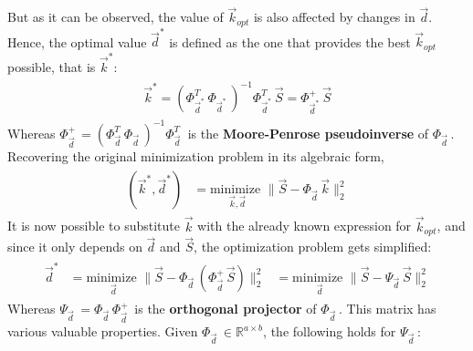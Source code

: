 \documentclass[11pt]{scrartcl} %
\begin{document}
But as it can be observed, the value of \(\vec{k}_{opt}\) is also affected by changes in \(\vec{d}\). Hence, the optimal value \(\vec{d}^*\) is defined as the one that provides the best \(\vec{k}_{opt}\) possible, that is \(\vec{k}^*\):
\begin{align*}
    \begin{aligned}
      \vec{k}^* =  (\Phi_{\vec{d}^*\;}^T \Phi_{\vec{d}^*\;})^{-1} \Phi_{\vec{d}^*\;}^T\vec{S} = \Phi_{\vec{d}^*\;}^+ \vec{S}
    \end{aligned}
\end{align*}
Whereas \(\Phi_{\vec{d}\;}^+ = (\Phi_{\vec{d}\;}^T \Phi_{\vec{d}\;})^{-1} \Phi_{\vec{d}\;}^T\) is the \textbf{Moore-Penrose pseudoinverse} of \(\Phi_{\vec{d}\;}\).\\
Recovering the original minimization problem in its algebraic form,
\begin{align*}
  \begin{aligned}
    (\vec{k}^*, \vec{d}^*) &= \underset{\vec{k}, \vec{d}}{\text{minimize }}
    \bigg\lVert \vec{S}-\Phi_{\vec{d}\;} \vec{k}\bigg\rVert_2^2
    \end{aligned}
\end{align*}
It is now possible to substitute \(\vec{k}\) with the already known expression for \(\vec{k}_{opt}\), and since it only depends on \(\vec{d}\) and \(\vec{S}\), the optimization problem gets simplified:
\begin{align*}
  \begin{aligned}
    \vec{d}^* &= \underset{\vec{d}}{\text{minimize }}
    \bigg\lVert \vec{S}-\Phi_{\vec{d}\;} (\Phi_{\vec{d}\;}^+ \vec{S}) \bigg\rVert_2^2 &= \underset{\vec{d}}{\text{minimize }}
    \bigg\lVert \vec{S}- \Psi_{\vec{d}\;} \vec{S} \bigg\rVert_2^2
    \end{aligned}
\end{align*}
Whereas \(\Psi_{\vec{d}\;} =  \Phi_{\vec{d}\;} \Phi_{\vec{d}\;}^+\) is the \textbf{orthogonal projector} of \(\Phi_{\vec{d}\;}\). This matrix has various valuable properties. Given \(\Phi_{\vec{d}\;}\in\mathbb{R}^{a\times b}\), the following holds for \(\Psi_{\vec{d}\;}\):
\end{document}

